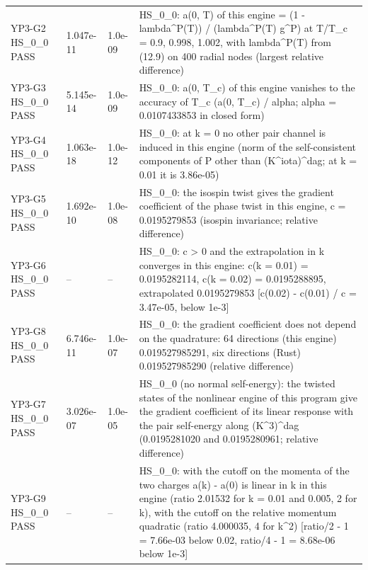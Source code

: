 \documentclass[aps,prd,onecolumn,superscriptaddress,nofootinbib,floatfix,longbibliography]{revtex4-2}
\begin{document}
\begin{longtable}{p{}p{}p{}p{}}
YP3-G2 HS\_0\_0 \newline PASS & 1.047e-11 & 1.0e-09 & HS\_0\_0: a(0, T) of this engine = (1 - lambda\textasciicircum{}P(T)) / (lambda\textasciicircum{}P(T) g\textasciicircum{}P) at T/T\_c = 0.9, 0.998, 1.002, with lambda\textasciicircum{}P(T) from (12.9) on 400 radial nodes (largest relative difference) \\
YP3-G3 HS\_0\_0 \newline PASS & 5.145e-14 & 1.0e-09 & HS\_0\_0: a(0, T\_c) of this engine vanishes to the accuracy of T\_c (\textbar{}a(0, T\_c)\textbar{} / alpha; alpha = 0.0107433853 in closed form) \\
YP3-G4 HS\_0\_0 \newline PASS & 1.063e-18 & 1.0e-12 & HS\_0\_0: at k = 0 no other pair channel is induced in this engine (norm of the self-consistent components of P other than (K\textasciicircum{}iota)\textasciicircum{}dag; at k = 0.01 it is 3.86e-05) \\
YP3-G5 HS\_0\_0 \newline PASS & 1.692e-10 & 1.0e-08 & HS\_0\_0: the isospin twist gives the gradient coefficient of the phase twist in this engine, c = 0.0195279853 (isospin invariance; relative difference) \\
YP3-G6 HS\_0\_0 \newline PASS & -- & -- & HS\_0\_0: c \textgreater{} 0 and the extrapolation in k converges in this engine: c(k = 0.01) = 0.0195282114, c(k = 0.02) = 0.0195288895, extrapolated 0.0195279853 [\textbar{}c(0.02) - c(0.01)\textbar{} / c = 3.47e-05, below 1e-3] \\
YP3-G8 HS\_0\_0 \newline PASS & 6.746e-11 & 1.0e-07 & HS\_0\_0: the gradient coefficient does not depend on the quadrature: 64 directions (this engine) 0.019527985291, six directions (Rust) 0.019527985290 (relative difference) \\
YP3-G7 HS\_0\_0 \newline PASS & 3.026e-07 & 1.0e-05 & HS\_0\_0 (no normal self-energy): the twisted states of the nonlinear engine of this program give the gradient coefficient of its linear response with the pair self-energy along (K\textasciicircum{}3)\textasciicircum{}dag (0.0195281020 and 0.0195280961; relative difference) \\
YP3-G9 HS\_0\_0 \newline PASS & -- & -- & HS\_0\_0: with the cutoff on the momenta of the two charges a(k) - a(0) is linear in \textbar{}k\textbar{} in this engine (ratio 2.01532 for k = 0.01 and 0.005, 2 for \textbar{}k\textbar{}), with the cutoff on the relative momentum quadratic (ratio 4.000035, 4 for k\textasciicircum{}2) [\textbar{}ratio/2 - 1\textbar{} = 7.66e-03 below 0.02, \textbar{}ratio/4 - 1\textbar{} = 8.68e-06 below 1e-3] \\

\end{longtable}
\end{document}
